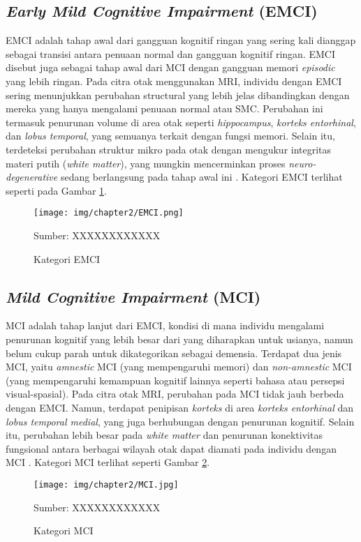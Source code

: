     \subsection{\textit{Early Mild Cognitive Impairment} (EMCI)}
    EMCI adalah tahap awal dari gangguan kognitif ringan yang sering kali dianggap sebagai transisi antara penuaan normal dan gangguan kognitif ringan. EMCI disebut juga sebagai tahap awal dari MCI dengan gangguan memori \textit{episodic} yang lebih ringan. Pada citra otak menggunakan MRI, individu dengan EMCI sering menunjukkan perubahan structural yang lebih jelas dibandingkan dengan mereka yang hanya mengalami penuaan normal atau SMC. Perubahan ini termasuk penurunan volume di area otak seperti \textit{hippocampus}, \textit{korteks entorhinal}, dan \textit{lobus temporal}, yang semuanya terkait dengan fungsi memori. Selain itu, terdeteksi perubahan struktur mikro pada otak dengan mengukur integritas materi putih (\textit{white matter}), yang mungkin mencerminkan proses \textit{neuro-degenerative} sedang berlangsung pada tahap awal ini \autocite{Kang2020}. Kategori EMCI terlihat seperti pada Gambar \ref{fig:emci}.
    \begin{figure}[H] 
        \begin{center} 
            \texttt{[image: img/chapter2/EMCI.png]}
            \caption{Kategori EMCI} 
            \label{fig:emci}
            Sumber: XXXXXXXXXXXX
        \end{center} 
    \end{figure}

    \subsection{\textit{Mild Cognitive Impairment} (MCI)}
    MCI adalah tahap lanjut dari EMCI, kondisi di mana individu mengalami penurunan kognitif yang lebih besar dari yang diharapkan untuk usianya, namun belum cukup parah untuk dikategorikan sebagai demensia. Terdapat dua jenis MCI, yaitu \textit{amnestic} MCI (yang mempengaruhi memori) dan \textit{non-amnestic} MCI (yang mempengaruhi kemampuan kognitif lainnya seperti bahasa atau persepsi visual-spasial). Pada citra otak MRI, perubahan pada MCI tidak jauh berbeda dengan EMCI. Namun, terdapat penipisan \textit{korteks} di area \textit{korteks entorhinal} dan \textit{lobus temporal medial}, yang juga berhubungan dengan penurunan kognitif. Selain itu, perubahan lebih besar pada \textit{white matter} dan penurunan konektivitas fungsional antara berbagai wilayah otak dapat diamati pada individu dengan MCI \autocite{Song2021}. Kategori MCI terlihat seperti Gambar \ref{fig:mci}.
    \begin{figure}[H] 
        \begin{center} 
            \texttt{[image: img/chapter2/MCI.jpg]}
            \caption{Kategori MCI} 
            \label{fig:mci}
            Sumber: XXXXXXXXXXXX
        \end{center} 
    \end{figure}


